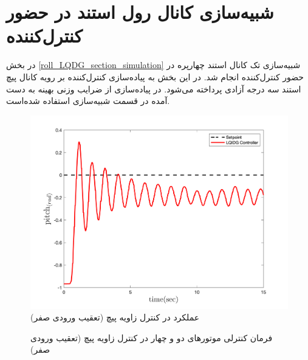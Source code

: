 \section{شبیه‌سازی کانال رول استند در حضور کنترل‌کننده }
در بخش
\ref{roll_LQDG_section_simulation}
شبیه‌سازی تک کانال استند چهارپره در حضور کنترل‌کننده  انجام شد. در این بخش به پیاده‌سازی کنترل‌کننده  بر رویه کانال پیچ استند سه درجه آزادی پرداخته می‌شود.
در پیاده‌سازی از ضرایب وزنی بهینه به دست آمده در قسمت شبیه‌سازی استفاده شده‌است.
\begin{figure}[H]
	\includegraphics[width=.48\linewidth]{../Figures/Calibration/LQDG/Pitch/lqdg_pitch.png}
	\centering
	\caption{عملكرد  در کنترل زاويه پیچ (تعقیب ورودی صفر)}
\end{figure}

\begin{figure}[H]
	\centering
	\caption{‫‪فرمان کنترلی موتورهای دو و چهار در کنترل زاویه پیچ (تعقیب ورودی صفر)}
\end{figure}


